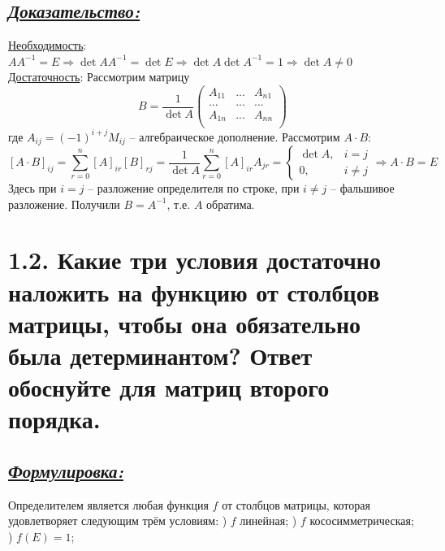 \documentclass{article}
\begin{document}
\subsection*{\Large \underline{\textit{Доказательство: }}}
\underline{Необходимость}:
\newline $AA^{-1} = E \Rightarrow \det{AA^{-1}} = \det{E} \Rightarrow \det{A}\det{A^{-1}} = 1 \Rightarrow \det{A} \ne 0$
\newline \underline{Достаточность}:
\newline Рассмотрим матрицу 
$$
B = 
\frac{1}{\det{A}}
\begin{pmatrix}
A_{11} & ... & A_{n1} \\
... & ... & ... \\
A_{1n} & ... & A_{nn} \\
\end{pmatrix}
$$
где $A_{ij} = (-1)^{i + j}M_{ij}$ -- алгебраическое дополнение. Рассмотрим $A \cdot B$:
$$
[A \cdot B]_{ij} = \sum_{r = 0}^{n} [A]_{ir}[B]_{rj} = \frac{1}{\det{A}} \sum_{r = 0}^{n} [A]_{ir} A_{jr} = 
\begin{cases}
\det{A}, & i = j \\
0, & i \ne j 
\end{cases}
\Rightarrow A \cdot B = E
$$
Здесь при $i = j$ -- разложение определителя по строке, при $i \ne j$ -- фальшивое разложение. Получили $B = A^{-1}$, т.е. $A$ обратима.

\section*{\LARGE 1.2. Какие три условия достаточно наложить на функцию от столбцов матрицы, чтобы она обязательно была детерминантом? Ответ обоснуйте для матриц второго порядка. }
\subsection*{\Large \underline{\textit{Формулировка: }}}
Определителем является любая функция $f$ от столбцов матрицы, которая удовлетворяет следующим трём условиям:
) $f$ линейная;
) $f$ кососимметрическая;
) $f(E) = 1$;
\end{document}
